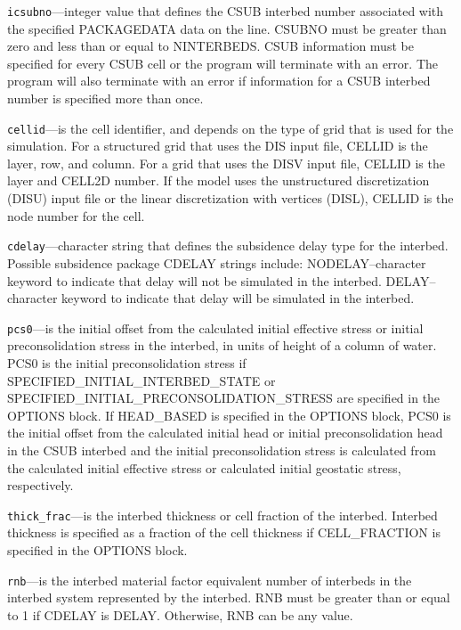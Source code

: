 \begin{description}
\item \texttt{icsubno}---integer value that defines the CSUB interbed number associated with the specified PACKAGEDATA data on the line. CSUBNO must be greater than zero and less than or equal to NINTERBEDS.  CSUB information must be specified for every CSUB cell or the program will terminate with an error.  The program will also terminate with an error if information for a CSUB interbed number is specified more than once.

\item \texttt{cellid}---is the cell identifier, and depends on the type of grid that is used for the simulation.  For a structured grid that uses the DIS input file, CELLID is the layer, row, and column.   For a grid that uses the DISV input file, CELLID is the layer and CELL2D number.  If the model uses the unstructured discretization (DISU) input file or the linear discretization with vertices (DISL), CELLID is the node number for the cell.

\item \texttt{cdelay}---character string that defines the subsidence delay type for the interbed. Possible subsidence package CDELAY strings include: NODELAY--character keyword to indicate that delay will not be simulated in the interbed.  DELAY--character keyword to indicate that delay will be simulated in the interbed.

\item \texttt{pcs0}---is the initial offset from the calculated initial effective stress or initial preconsolidation stress in the interbed, in units of height of a column of water. PCS0 is the initial preconsolidation stress if SPECIFIED\_INITIAL\_INTERBED\_STATE or SPECIFIED\_INITIAL\_PRECONSOLIDATION\_STRESS are specified in the OPTIONS block. If HEAD\_BASED is specified in the OPTIONS block, PCS0 is the initial offset from the calculated initial head or initial preconsolidation head in the CSUB interbed and the initial preconsolidation stress is calculated from the calculated initial effective stress or calculated initial geostatic stress, respectively.

\item \texttt{thick\_frac}---is the interbed thickness or cell fraction of the interbed. Interbed thickness is specified as a fraction of the cell thickness if CELL\_FRACTION is specified in the OPTIONS block.

\item \texttt{rnb}---is the interbed material factor equivalent number of interbeds in the interbed system represented by the interbed. RNB must be greater than or equal to 1 if CDELAY is DELAY. Otherwise, RNB can be any value.


\end{description}
